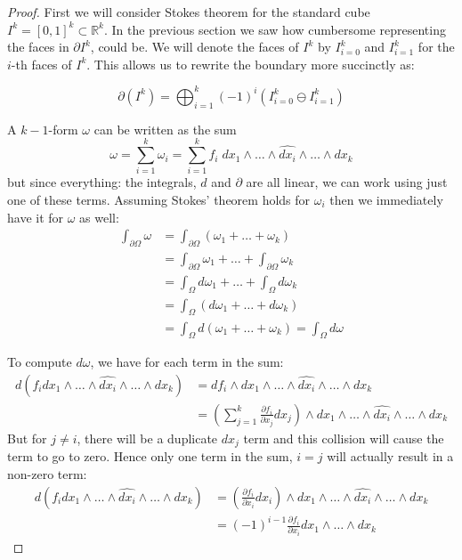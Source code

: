 \begin{proof}

First we will consider Stokes theorem for the standard cube $I^k = [0,1]^k \subset \mathbb{R}^k$.
In the previous section we saw how cumbersome representing the faces in $\partial I^k$, could be.
We will denote the faces of $I^k$ by $I^k_{i=0}$ and $I^k_{i=1}$ for the $i$-th faces of $I^k$.
This allows us to rewrite the boundary more succinctly as:


\begin{equation}
	\partial (I^k) = \bigoplus_{i=1}^k (-1)^i \left( I^k_{i=0} \ominus I^k_{i=1} \right) 
\end{equation}



A $k-1$-form $\omega$ can be written as the sum
\begin{equation}
	\omega 
		= \sum_{i=1}^k \omega_i 
		= \sum_{i=1}^k f_i \; dx_1 \wedge \ldots \wedge \widehat{dx_i} \wedge  \ldots \wedge dx_k
\end{equation}
but since everything: the integrals, $d$ and $\partial$ are all linear, we can work using just one of these terms.
Assuming Stokes' theorem holds for $\omega_i$ then we immediately have it for $\omega$ as well:
\begin{align*}
	\int_{\partial\Omega} \omega 
	&= \int_{\partial \Omega} (\omega_1 + \ldots + \omega_k) \\
	&= \int_{\partial\Omega} \omega_1 + \ldots + \int_{\partial\Omega} \omega_k  \\
	&= \int_{\Omega} d\omega_1 + \ldots + \int_\Omega d\omega_k \\
	&= \int_\Omega (d\omega_1 + \ldots + d\omega_k)\\
	&= \int_\Omega d(\omega_1 + \ldots + \omega_k) = \int_\Omega d\omega
\end{align*}



To compute $d\omega$, we have for each term in the sum:
\begin{align*}
	d \left( f_i dx_1 \wedge \ldots \wedge \widehat{dx_i} \wedge  \ldots \wedge dx_k \right) 
 		&= df_i \wedge dx_1 \wedge \ldots \wedge \widehat{dx_i} \wedge  \ldots \wedge dx_k \\ 
 		&= \left( \sum_{j=1}^k \frac{\partial f_i}{\partial x_j} dx_j \right)
 			\wedge dx_1 \wedge \ldots \wedge \widehat{dx_i} \wedge  \ldots \wedge dx_k
\end{align*}
But for $j \neq i$, there will be a duplicate $dx_j$ term and this collision will cause the term to go to zero.
Hence only one term in the sum, $i=j$ will actually result in a non-zero term:
\begin{align*}
	d \left( f_i dx_1 \wedge \ldots \wedge \widehat{dx_i} \wedge  \ldots \wedge dx_k \right) 
 		&= \left(\frac{\partial f_i}{\partial x_i} dx_i \right)
 			\wedge dx_1 \wedge \ldots \wedge \hat{dx_i} \wedge  \ldots \wedge dx_k \\ 
		&= (-1)^{i-1} \frac{\partial f_i}{\partial x_i}
 			 dx_1 \wedge \ldots \wedge dx_k
\end{align*}


\end{proof}
